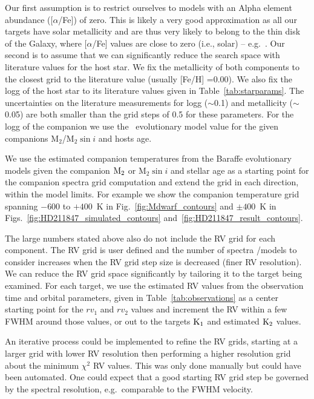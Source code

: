 \documentclass[fleqn,usenatbib]{mnras}
\begin{document}
Our first assumption is to restrict ourselves to models with an Alpha element abundance (\([\alpha\)/Fe]) of zero. This is likely a very good approximation as all our targets have solar metallicity and are thus very likely to belong to the thin disk of the Galaxy, where \([\alpha\)/Fe] values are close to zero (i.e., solar) -- e.g.~\citet{adibekyan_chemical_2012}. Our second is to assume that we can significantly reduce the search space with literature values for the host star. We fix the metallicity of both components to the closest grid to the literature value (usually [Fe/H] =0.00). We also fix the logg of the host star to its literature values given in Table~\ref{tab:starparams}. The uncertainties on the literature measurements for logg (\(\sim\)0.1) and metallicity (\(\sim\)0.05) are both smaller than the grid steps of 0.5 for these parameters.
For the logg of the companion we use the~\citet{baraffe_evolutionary_2003,baraffe_new_2015} evolutionary model value for the given companions \(\textrm{M}_2\)/\(\textrm{M}_2\sin{i}\) and hosts age.

We use the estimated companion temperatures from the Baraffe evolutionary models given the companion \(\rm M_2\) or \(\textrm{M}_2\sin{i}\) and stellar age as a starting point for the companion spectra grid computation and extend the grid in each direction, within the model limits. For example we show the companion temperature grid spanning \(-600\) to \(+400\)~K in Fig.~\ref{fig:Mdwarf_contours} and \(\pm400\)~K in Figs.~\ref{fig:HD211847_simulated_contours} and~\ref{fig:HD211847_result_contours}.

The large numbers stated above also do not include the RV grid for each component. The RV grid is user defined and the number of spectra /models to consider increases when the RV grid step size is decreased (finer RV resolution). We can reduce the RV grid space significantly by tailoring it to the target being examined. For each target, we use the estimated RV values from the observation time and orbital parameters, given in Table~\ref{tab:observations} as a center starting point for the \({rv}_1\) and \({rv}_2\) values and increment the RV within a few FWHM around those values, or out to the targets \(\rm K_1\) and estimated \(\rm K_2\) values.

An iterative process could be implemented to refine the RV grids, starting at a larger grid with lower RV resolution then performing a higher resolution grid about the minimum \(\chi^2\) RV values. This was only done manually but could have been automated. One could expect that a good starting RV grid step be governed by the spectral resolution, e.g.\ comparable to the FWHM velocity.
\end{document}

